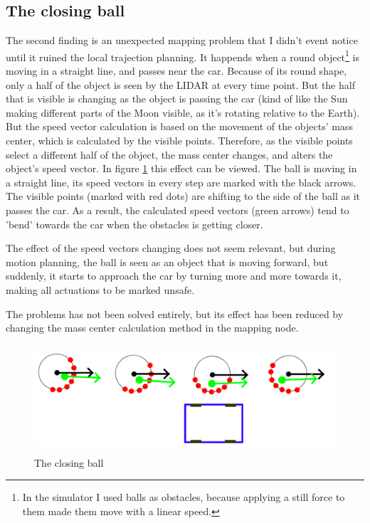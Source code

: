 \subsection{The closing ball}
The second finding is an unexpected mapping problem that I didn't event notice until it ruined the local trajection planning. It happends when a round object\footnote{In the simulator I used balls as obstacles, because applying a still force to them made them move with a linear speed.} is moving in a straight line, and passes near the car. Because of its round shape, only a half of the object is seen by the LIDAR at every time point. But the half that is visible is changing as the object is passing the car (kind of like the Sun making different parts of the Moon visible, as it's rotating relative to the Earth). But the speed vector calculation is based on the movement of the objects' mass center, which is calculated by the visible points. Therefore, as the visible points select a different half of the object, the mass center changes, and alters the object's speed vector. In figure \ref{closing_ball} this effect can be viewed. The ball is moving in a straight line, its speed vectors in every step are marked with the black arrows. The visible points (marked with red dots) are shifting to the side of the ball as it passes the car. As a result, the calculated speed vectors (green arrows) tend to 'bend' towards the car when the obstacles is getting closer.

The effect of the speed vectors changing does not seem relevant, but during motion planning, the ball is seen as an object that is moving forward, but suddenly, it starts to approach the car by turning more and more towards it, making all actuations to be marked unsafe.

The problems has not been solved entirely, but its effect has been reduced by changing the mass center calculation method in the mapping node.

\begin{figure}[!ht]
    \centering
    \includegraphics[height=40mm]{figures/raw/closing_ball.png}
    \caption{The closing ball}
    \label{closing_ball}
\end{figure} 